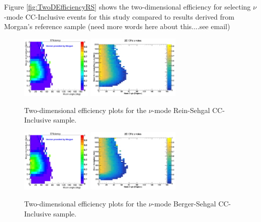 \documentclass[11pt]{article}
\begin{document}
Figure \ref{fig:TwoDEfficiencyRS} shows the two-dimensional efficiency for selecting $\nu$-mode CC-Inclusive events for this study compared to results derived from Morgan's reference sample (need more words here about this....see email)

\begin{figure}[H]
\centering
\includegraphics[width=0.3\textwidth]{CCInclusivePlots/MorgansCCInclusiveSample.png}
\includegraphics[width=0.4\textwidth]{CCInclusivePlots/2DEffCompareNMRS.png}
\caption{Two-dimensional efficiency plots for the $\nu$-mode Rein-Sehgal CC-Inclusive sample.}
\end{figure}\label{fig:TwoDEfficiencyRS}

\begin{figure}[H]
\centering
\includegraphics[width=0.3\textwidth]{CCInclusivePlots/MorgansCCInclusiveSample.png}
\includegraphics[width=0.4\textwidth]{CCInclusivePlots/2DEffCompareNMBS.png}
\caption{Two-dimensional efficiency plots for the $\nu$-mode Berger-Sehgal CC-Inclusive sample.}
\end{figure}\label{fig:TwoDEfficiencyBS}
\end{document}
